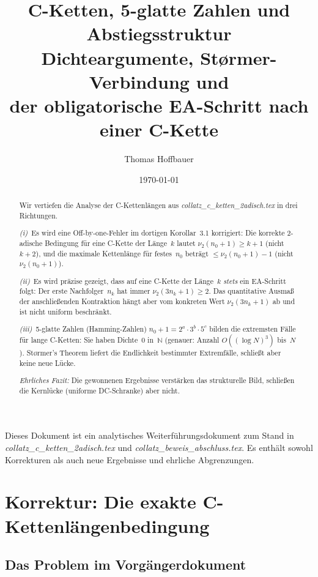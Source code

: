 \documentclass[12pt,a4paper]{article}
\title{%
  C-Ketten, 5-glatte Zahlen und Abstiegsstruktur\\[0.3em]
  \large Dichteargumente, Størmer-Verbindung und\\
  \large der obligatorische EA-Schritt nach einer C-Kette%
}
\author{Thomas Hoffbauer}
\date{\today}
\newcommand{\vii}{\nu_2}
\newcommand{\N}{\mathbb{N}}
\begin{document}
\maketitle

\begin{abstract}
Wir vertiefen die Analyse der C-Kettenlängen aus \textit{collatz\_c\_ketten\_2adisch.tex}
in drei Richtungen.

\emph{(i)}~Es wird eine Off-by-one-Fehler im dortigen Korollar~3.1 korrigiert:
Die korrekte 2-adische Bedingung für eine C-Kette der Länge~$k$ lautet
$\vii(n_0+1) \geq k+1$ (nicht $k+2$), und die maximale Kettenlänge für festes~$n_0$
beträgt $\leq \vii(n_0+1)-1$ (nicht $\vii(n_0+1)$).

\emph{(ii)}~Es wird präzise gezeigt, dass auf eine C-Kette der Länge~$k$
\emph{stets} ein EA-Schritt folgt: Der erste Nachfolger~$n_k$ hat immer
$\vii(3n_k+1) \geq 2$.  Das quantitative Ausmaß der anschließenden Kontraktion
hängt aber vom konkreten Wert $\vii(3n_k+1)$ ab und ist nicht uniform beschränkt.

\emph{(iii)}~5-glatte Zahlen (Hamming-Zahlen) $n_0+1 = 2^a \cdot 3^b \cdot 5^c$
bilden die extremsten Fälle für lange C-Ketten: Sie haben Dichte~$0$ in~$\N$
(genauer: Anzahl $O((\log N)^3)$ bis~$N$). Størmer's Theorem liefert die
Endlichkeit bestimmter Extremfälle, schließt aber keine neue Lücke.

\emph{Ehrliches Fazit:} Die gewonnenen Ergebnisse verstärken das strukturelle
Bild, schließen die Kernlücke (uniforme DC-Schranke) aber nicht.
\end{abstract}

\tableofcontents

\bigskip
\begin{tcolorbox}[warnung, title={Zur Einordnung}]
Dieses Dokument ist ein analytisches Weiterführungsdokument zum Stand in
\textit{collatz\_c\_ketten\_2adisch.tex} und \textit{collatz\_beweis\_abschluss.tex}.
Es enthält sowohl Korrekturen als auch neue Ergebnisse und ehrliche Abgrenzungen.
\end{tcolorbox}

\section{Korrektur: Die exakte C-Kettenlängenbedingung}
\label{sec:korrektur}

\subsection{Das Problem im Vorgängerdokument}
\end{document}
